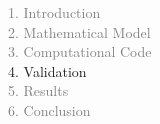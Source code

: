 
\begin{frame}
  \vspace{-1cm}
  \textcolor{gray}{1. Introduction}\\[0.1cm]
  \textcolor{gray}{2. Mathematical Model}\\[0.1cm]
  \textcolor{gray}{3. Computational Code}\\[0.1cm]
  4. Validation\\[0.1cm]
  \textcolor{gray}{5. Results}\\[0.1cm]
  \textcolor{gray}{6. Conclusion}
\end{frame}


\iffalse
